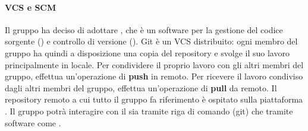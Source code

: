\paragraph{VCS e SCM} 
Il gruppo ha deciso di adottare , che è un software per la gestione del codice sorgente () e controllo di versione ().
Git è un VCS distribuito: ogni membro del gruppo \Gruppo{} ha quindi a disposizione una copia del repository e svolge il suo lavoro principalmente in locale.
Per condividere il proprio lavoro con gli altri membri del gruppo, effettua un'operazione di \textbf{push} in remoto.
Per ricevere il lavoro condiviso dagli altri membri del gruppo, effettua un'operazione di \textbf{pull} da remoto.
Il repository remoto a cui tutto il gruppo fa riferimento è ospitato sulla piattaforma .
Il gruppo \Gruppo{} potrà interagire con il  sia tramite riga di comando (git) che tramite software come .


